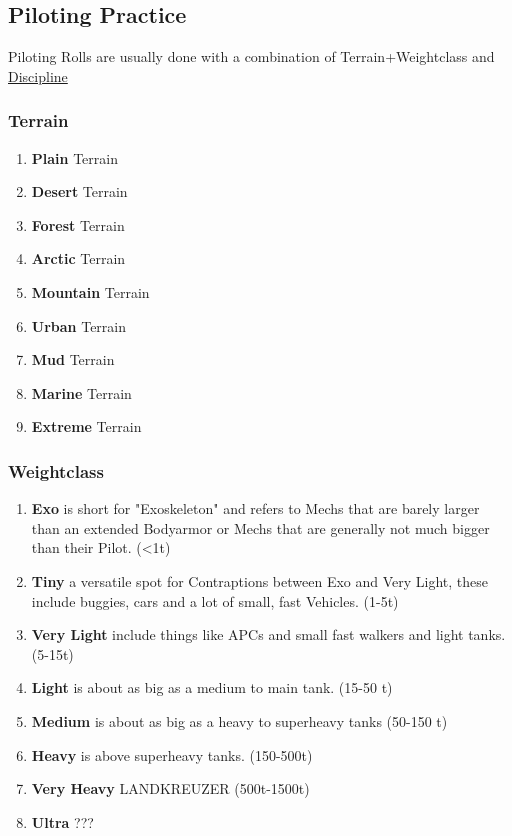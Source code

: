 \subsection{Piloting Practice}\label{subsec:piloting-practice}
Piloting Rolls are usually done with a combination of Terrain+Weightclass and \hyperref[itm:discipline]{Discipline}

\subsubsection{Terrain}\label{subsec:terrain}
\begin{enumerate}[label= -]
    \item \textbf{Plain} Terrain
    \item \textbf{Desert} Terrain
    \item \textbf{Forest} Terrain
    \item \textbf{Arctic} Terrain
    \item \textbf{Mountain} Terrain
    \item \textbf{Urban} Terrain
    \item \textbf{Mud} Terrain
    \item \textbf{Marine} Terrain
    \item \textbf{Extreme} Terrain
\end{enumerate}
\subsubsection{Weightclass}\label{subsec:weightclass}
\begin{enumerate}[label= -]
    \item \textbf{Exo} is short for "Exoskeleton" and refers to Mechs that are barely larger than an extended Bodyarmor
    or Mechs that are generally not much bigger than their Pilot. (<1t)
    \item \textbf{Tiny} a versatile spot for Contraptions between Exo and Very Light, these include buggies, cars and
    a lot of small, fast Vehicles. (1-5t)
    \item \textbf{Very Light} include things like APCs and small fast walkers and light tanks.(5-15t)
    \item \textbf{Light} is about as big as a medium to main tank. (15-50 t)
    \item \textbf{Medium} is about as big as a heavy to superheavy tanks (50-150 t)
    \item \textbf{Heavy} is above superheavy tanks. (150-500t)
    \item \textbf{Very Heavy} LANDKREUZER (500t-1500t)
    \item \textbf{Ultra} ???
\end{enumerate}


